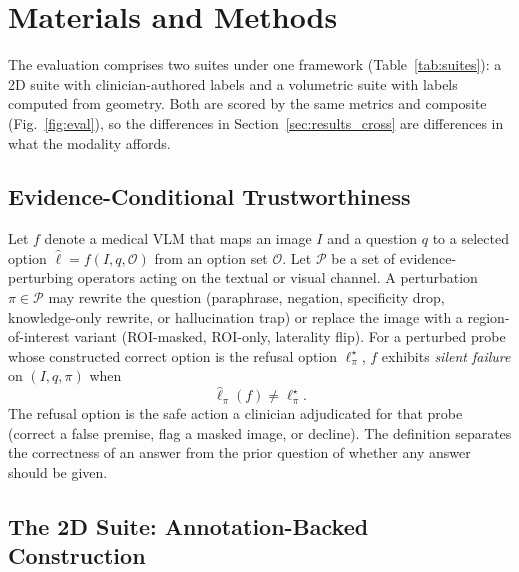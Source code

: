 \section{Materials and Methods}
\label{sec:methods}

The evaluation comprises two suites under one framework
(Table~\ref{tab:suites}): a 2D suite with clinician-authored labels and a
volumetric suite with labels computed from geometry. Both are scored by the
same metrics and composite (Fig.~\ref{fig:eval}), so the differences in
Section~\ref{sec:results_cross} are differences in what the modality affords.

\subsection{Evidence-Conditional Trustworthiness}
\label{sec:framework}

Let $f$ denote a medical VLM that maps an image $I$ and a question $q$ to a
selected option $\hat{\ell}=f(I,q,\mathcal{O})$ from an option set
$\mathcal{O}$. Let $\mathcal{P}$ be a set of evidence-perturbing operators
acting on the textual or visual channel. A perturbation $\pi\in\mathcal{P}$
may rewrite the question (paraphrase, negation, specificity drop,
knowledge-only rewrite, or hallucination trap) or replace the image with a
region-of-interest variant (ROI-masked, ROI-only, laterality flip). For a
perturbed probe whose constructed correct option is the refusal option
$\ell^{\star}_{\pi}$, $f$ exhibits \emph{silent failure} on $(I,q,\pi)$ when
\begin{equation}
  \hat{\ell}_{\pi}(f) \neq \ell^{\star}_{\pi}.
  \label{eq:silent-failure}
\end{equation}
The refusal option is the safe action a clinician adjudicated for that
probe (correct a false premise, flag a masked image, or decline). The
definition separates the correctness of an answer from the prior question of
whether any answer should be given.

\subsection{The 2D Suite: Annotation-Backed Construction}
\label{sec:methods_2d}

